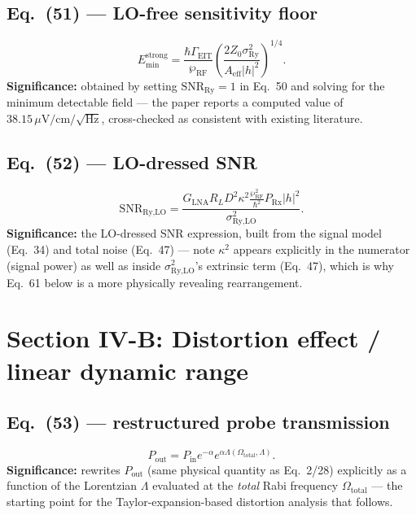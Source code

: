 \documentclass[11pt]{article}
\begin{document}
\subsection*{Eq.~(51) --- LO-free sensitivity floor}
\begin{equation}
E_\text{min}^\text{strong} = \frac{\hbar\Gamma_\text{EIT}}{\wp_\text{RF}}\left(\frac{2Z_0\sigma_\text{Ry}^2}{A_\text{eff}|h|^2}\right)^{1/4}. \tag{51}
\end{equation}
\textbf{Significance:} obtained by setting $\text{SNR}_\text{Ry}=1$ in
Eq.~50 and solving for the minimum detectable field --- the paper
reports a computed value of $38.15\,\mu\text{V/cm}/\sqrt{\text{Hz}}$,
cross-checked as consistent with existing literature.

\subsection*{Eq.~(52) --- LO-dressed SNR}
\begin{equation}
\text{SNR}_\text{Ry,LO} = \frac{G_\text{LNA}R_LD^2\kappa^2\frac{\wp_\text{RF}^2}{\hbar^2}P_\text{Rx}|h|^2}{\sigma_\text{Ry,LO}^2}. \tag{52}
\end{equation}
\textbf{Significance:} the LO-dressed SNR expression, built from the
signal model (Eq.~34) and total noise (Eq.~47) --- note $\kappa^2$
appears explicitly in the numerator (signal power) as well as inside
$\sigma_\text{Ry,LO}^2$'s extrinsic term (Eq.~47), which is why Eq.~61
below is a more physically revealing rearrangement.

\section{Section IV-B: Distortion effect / linear dynamic range}

\subsection*{Eq.~(53) --- restructured probe transmission}
\begin{equation}
P_\text{out} = P_\text{in}e^{-\alpha}e^{\alpha\Lambda(\Omega_\text{total},\Lambda)}. \tag{53}
\end{equation}
\textbf{Significance:} rewrites $P_\text{out}$ (same physical quantity
as Eq.~2/28) explicitly as a function of the Lorentzian $\Lambda$
evaluated at the \emph{total} Rabi frequency $\Omega_\text{total}$ ---
the starting point for the Taylor-expansion-based distortion analysis
that follows.
\end{document}
